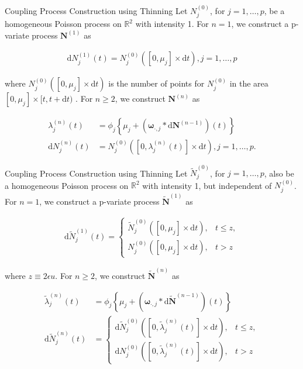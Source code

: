 \documentclass{beamer}		%
\newcommand{\dd}{\mathrm{d}}
\begin{document}
\begin{frame}{Coupling Process Construction using Thinning}
Let $N_j^{(0)}$, for $j = 1, \ldots, p$, be a homogeneous Poisson process on $\mathbb{R}^2$ with intensity 1. For $n=1$, we construct a p-variate process $\bm{N}^{(1)}$ as

\begin{align}
\dd N_j^{(1)}(t) = N_j^{(0)}([0,\mu_j] \times \dd t), j=1,\ldots,p
\end{align}

where $N_j^{(0)}([0,\mu_j] \times \dd t)$ is the number of points for $N_j^{(0)}$ in the area $[0,\mu_j] \times [t, t+\dd t)$ . For $n \ge 2$, we construct $\bm{N}^{(n)}$ as

\begin{align}
\lambda_j^{(n)}(t) &= \phi_j \left\{\mu_j + (\bm{\omega}_{\cdot,j} * \dd \bm{N}^{(n-1)})(t) \right\}\\
\dd N_j^{(n)}(t) &= N_j^{(0)}([0,\lambda_j^{(n)}(t)] \times \dd t), j=1,\ldots,p.
\end{align}

\end{frame}









\begin{frame}{Coupling Process Construction using Thinning}
Let $\tilde{N}_j^{(0)}$, for $j = 1, \ldots, p$, also be a homogeneous Poisson process on $\mathbb{R}^2$ with intensity 1, but independent of $N_j^{(0)}$. For $n=1$, we construct a p-variate process $\tilde{\bm{N}}^{(1)}$ as

\begin{align}
\dd \tilde{N}_j^{(1)}(t) = 
    \begin{cases}
    \tilde{N}_j^{(0)}([0,\mu_j] \times \dd t), & t \leq z,\\
    N_j^{(0)}([0,\mu_j] \times \dd t), & t > z
    \end{cases}
\end{align}

where $z \equiv 2 \epsilon u$. For $n \ge 2$, we construct $\tilde{\bm{N}}^{(n)}$ as

\begin{align}
\tilde{\lambda}_j^{(n)}(t) &= \phi_j \left\{\mu_j + (\bm{\omega}_{\cdot,j} * \dd \tilde{\bm{N}}^{(n-1)})(t) \right\}\\
\dd \tilde{N}_j^{(n)}(t) &= 
    \begin{cases}
    \dd \tilde{N}_j^{(0)}([0,\tilde{\lambda}_j^{(n)}(t)] \times \dd t), & t \leq z,\\
    \dd N_j^{(0)}([0,\tilde{\lambda}_j^{(n)}(t)] \times \dd t), & t > z
    \end{cases}
\end{align}

\end{frame}
\end{document}
